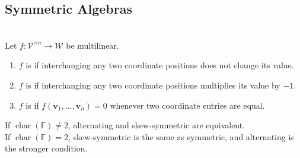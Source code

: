 \subsection{Symmetric Algebras}


\begin{definition} \label{def:special-multilinear-maps} \\
Let $f:\mathcal{V}^{\times n}\to\mathcal{W}$ be multilinear.
\begin{enumerate}[label=(\roman*)]
\setlength{\itemsep}{0pt}
\item $f$ is  if interchanging any two coordinate positions does not change its value.
\item $f$ is  if interchanging any two coordinate positions multiplies its value by $-1$.
\item $f$ is  if $f(\mathbf{v}_1,\ldots,\mathbf{v}_n)=0$ whenever two coordinate entries are equal.
\end{enumerate}
If $\operatorname{char}(\mathbb{F})\neq2$, alternating and skew-symmetric are equivalent.\\
If $\operatorname{char}(\mathbb{F})=2$, skew-symmetric is the same as symmetric, and alternating is the stronger condition.
\end{definition}

